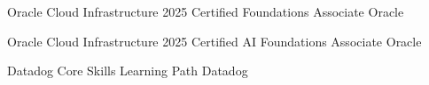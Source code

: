 
\projectHeading
{Oracle Cloud Infrastructure 2025 Certified Foundations Associate}
{Oracle}

\projectHeading
{Oracle Cloud Infrastructure 2025 Certified AI Foundations Associate}
{Oracle}

\projectHeading
{Datadog Core Skills Learning Path}
{Datadog}